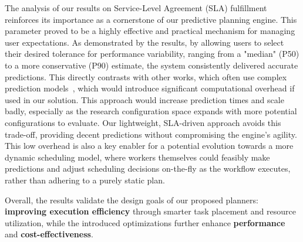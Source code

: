 The analysis of our results on Service-Level Agreement (SLA) fulfillment reinforces its importance as a cornerstone of our predictive planning engine. This parameter proved to be a highly effective and practical mechanism for managing user expectations. As demonstrated by the results, by allowing users to select their desired tolerance for performance variability, ranging from a "median" (P50) to a more conservative (P90) estimate, the system consistently delivered accurate predictions. This directly contrasts with other works, which often use complex prediction models~\cite{cose,orion,jolteon,predictiveadaptive}, which would introduce significant computational overhead if used in our solution. This approach would increase prediction times and scale badly, especially as the research configuration space expands with more potential configurations to evaluate. Our lightweight, SLA-driven approach avoids this trade-off, providing decent predictions without compromising the engine's agility. This low overhead is also a key enabler for a potential evolution towards a more dynamic scheduling model, where workers themselves could feasibly make predictions and adjust scheduling decisions on-the-fly as the workflow executes, rather than adhering to a purely static plan.

Overall, the results validate the design goals of our proposed planners: \textbf{improving execution efficiency} through smarter task placement and resource utilization, while the introduced optimizations further enhance \textbf{performance} and \textbf{cost-effectiveness}.
